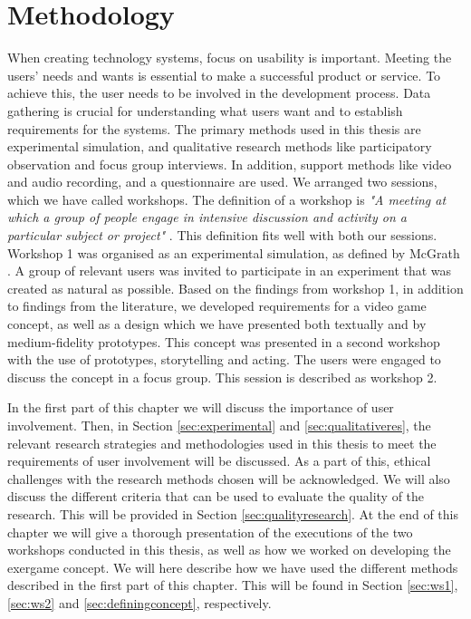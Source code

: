 \chapter{Methodology}
\label{chap:metode}
When creating technology systems, focus on usability is important. Meeting the users' needs and wants is essential to make a successful product or service. To achieve this, the user needs to be involved in the development process. Data gathering is crucial for understanding what users want and to establish requirements for the systems. The primary methods used in this thesis are experimental simulation, and qualitative research methods like participatory observation and focus group interviews. In addition, support methods like video and audio recording, and a questionnaire are used. We arranged two sessions, which we have called workshops. The definition of a workshop is \emph{"A meeting at which a group of people engage in intensive discussion and activity on a particular subject or project"} \cite{dictionary}. This definition fits well with both our sessions. Workshop 1 was organised as an experimental simulation, as defined by McGrath \cite{McGrath}. A group of relevant users was invited to participate in an experiment that was created as natural as possible. Based on the findings from workshop 1, in addition to findings from the literature, we developed requirements for a video game concept, as well as a design which we have presented both textually and by medium-fidelity prototypes. This concept was presented in a second workshop with the use of prototypes, storytelling and acting. The users were engaged to discuss the concept in a focus group. This session is described as workshop 2.

In the first part of this chapter we will discuss the importance of user involvement. Then, in Section \ref{sec:experimental} and \ref{sec:qualitativeres}, the relevant research strategies and methodologies used in this thesis to meet the requirements of user involvement will be discussed. As a part of this, ethical challenges with the research methods chosen will be acknowledged. We will also discuss the different criteria that can be used to evaluate the quality of the research. This will be provided in Section \ref{sec:qualityresearch}.  At the end of this chapter we will give a thorough presentation of the executions of the two workshops conducted in this thesis, as well as how we worked on developing the exergame concept. We will here describe how we have used the different methods described in the first part of this chapter. This will be found in Section \ref{sec:ws1}, \ref{sec:ws2} and \ref{sec:definingconcept}, respectively. 


